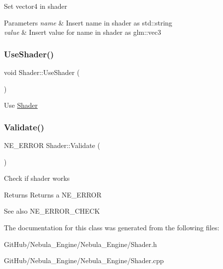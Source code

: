 Set vector4 in shader 
\begin{DoxyParams}{Parameters}
{\em name} & Insert name in shader as std\+::string \\
\hline
{\em value} & Insert value for \textquotesingle{}name\textquotesingle{} in shader as glm\+::vec3 \\
\hline
\end{DoxyParams}
\mbox{\label{class_shader_a08706ac2b4375d3bb7a6b38db0369f44}} 
\subsubsection{\texorpdfstring{UseShader()}{UseShader()}}
{\footnotesize\ttfamily void Shader\+::\+Use\+Shader (\begin{DoxyParamCaption}{ }\end{DoxyParamCaption})}

Use \mbox{\hyperlink{class_shader}{Shader}} \mbox{\label{class_shader_a7cee617233ae421013677cf8a73474fd}} 
\subsubsection{\texorpdfstring{Validate()}{Validate()}}
{\footnotesize\ttfamily N\+E\+\_\+\+E\+R\+R\+OR Shader\+::\+Validate (\begin{DoxyParamCaption}{ }\end{DoxyParamCaption})}

Check if shader works \begin{DoxyReturn}{Returns}
Returns a N\+E\+\_\+\+E\+R\+R\+OR 
\end{DoxyReturn}
\begin{DoxySeeAlso}{See also}
N\+E\+\_\+\+E\+R\+R\+O\+R\+\_\+\+C\+H\+E\+CK 
\end{DoxySeeAlso}


The documentation for this class was generated from the following files\+:\begin{DoxyCompactItemize}
\item 
Git\+Hub/\+Nebula\+\_\+\+Engine/\+Nebula\+\_\+\+Engine/Shader.\+h\item 
Git\+Hub/\+Nebula\+\_\+\+Engine/\+Nebula\+\_\+\+Engine/Shader.\+cpp\end{DoxyCompactItemize}
